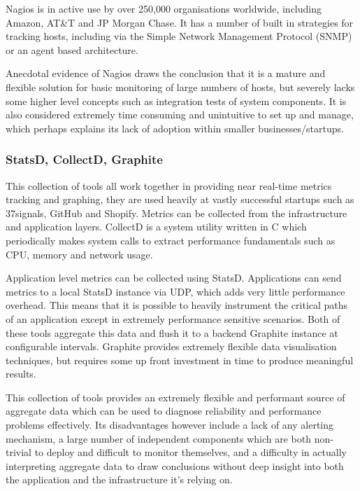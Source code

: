 \documentclass{cshonours}
\begin{document}
Nagios is in active use by over 250,000 organisations worldwide, including Amazon, AT\&T and JP Morgan Chase. It has a number of built in strategies for tracking hosts, including via the Simple Network Management Protocol (SNMP) or an agent based architecture.

Anecdotal evidence of Nagios draws the conclusion that it is a mature and flexible solution for basic monitoring of large numbers of hosts, but severely lacks some higher level concepts such as integration tests of system components. It is also considered extremely time consuming and unintuitive to set up and manage, which perhaps explains its lack of adoption within smaller businesses/startups.

\subsubsection{StatsD, CollectD, Graphite}

This collection of tools all work together in providing near real-time metrics tracking and graphing, they are used heavily at vastly successful startups such as 37signals, GitHub and Shopify. Metrics can be collected from the infrastructure and application layers. 
CollectD is a system utility written in C which periodically makes system calls to extract performance fundamentals such as CPU, memory and network usage. 

Application level metrics can be collected using StatsD. Applications can send metrics to a local StatsD instance via UDP, which adds very little performance overhead. This means that it is possible to heavily instrument the critical paths of an application except in extremely performance sensitive scenarios. Both of these tools aggregate this data and flush it to a backend Graphite instance at configurable intervals. Graphite provides extremely flexible data visualisation techniques, but requires some up front investment in time to produce meaningful results.

This collection of tools provides an extremely flexible and performant source of aggregate data which can be used to diagnose reliability and performance problems effectively. Its disadvantages however include a lack of any alerting mechanism, a large number of independent components which are both non-trivial to deploy and difficult to monitor themselves, and a difficulty in actually interpreting aggregate data to draw conclusions without deep insight into both the application and the infrastructure it’s relying on.
\end{document}
